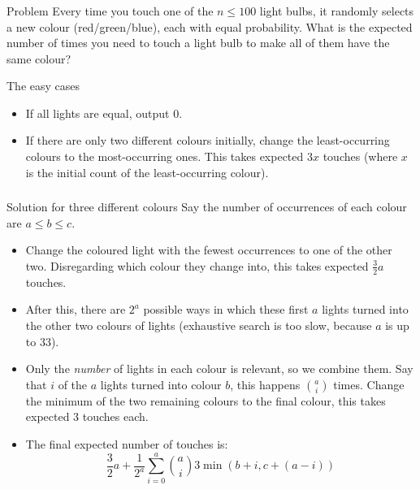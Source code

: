 \begin{frame}
    \frametitle{\problemtitle}
    \begin{block}{Problem}
        Every time you touch one of the $n \leq 100$ light bulbs, it randomly selects a new colour (red/green/blue),
        each with equal probability.
        What is the expected number of times you need to touch a light bulb
        to make all of them have the same colour?
    \end{block}
    \pause
    \begin{block}{The easy cases}
        \begin{itemize}
            \item If all lights are equal, output $0$.
            \pause
            \item If there are only two different colours initially,
                change the least-occurring colours to the most-occurring ones.
                This takes expected $3x$ touches (where $x$ is the initial count of the least-occurring colour).
        \end{itemize}
    \end{block}
\end{frame}

\begin{frame}
    \frametitle{\problemtitle}
    \begin{block}{Solution for three different colours}
        Say the number of occurrences of each colour are $a \leq b \leq c$.
        \begin{itemize}
            \item Change the coloured light with the fewest occurrences to one of the other two.
                Disregarding which colour they change into, this takes expected $\frac32 a$ touches.
            \pause
            \item After this, there are $2^a$ possible ways in which these first $a$ lights turned into the other two colours of lights (exhaustive search is too slow, because $a$ is up to $33$).
            \pause
            \item Only the \emph{number} of lights in each colour is relevant, so we combine them.
                Say that $i$ of the $a$ lights turned into colour $b$, this happens $\binom ai$ times.
                Change the minimum of the two remaining colours to the final colour,
                this takes expected 3 touches each.
            \pause
            \item The final expected number of touches is:
                $$
                    {\textstyle \frac32} a +
                    \frac{1}{2^a}
                    \sum_{i=0}^{a} {\textstyle \binom ai} 3 \min(b + i, c + (a - i))
                $$
        \end{itemize}
    \end{block}
\end{frame}

